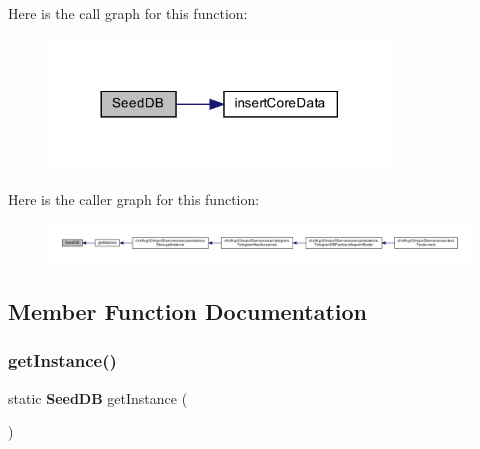 Here is the call graph for this function\+:\nopagebreak
\begin{figure}[H]
\begin{center}
\leavevmode
\includegraphics[width=257pt]{d6/ddb/classch_1_1bfh_1_1gr33nopo55um_1_1enocean_1_1persistence_1_1SeedDB_a60b74c6d59d0b33a91d759bd30b68c26_cgraph}
\end{center}
\end{figure}
Here is the caller graph for this function\+:\nopagebreak
\begin{figure}[H]
\begin{center}
\leavevmode
\includegraphics[width=350pt]{d6/ddb/classch_1_1bfh_1_1gr33nopo55um_1_1enocean_1_1persistence_1_1SeedDB_a60b74c6d59d0b33a91d759bd30b68c26_icgraph}
\end{center}
\end{figure}


\subsection{Member Function Documentation}
\label{classch_1_1bfh_1_1gr33nopo55um_1_1enocean_1_1persistence_1_1SeedDB_afb73015d7926e727ea780d4fa03ca1a4} 
\subsubsection{get\+Instance()}
{\footnotesize\ttfamily static {\bf Seed\+DB} get\+Instance (\begin{DoxyParamCaption}{ }\end{DoxyParamCaption})\hspace{0.3cm}{\ttfamily [static]}}

